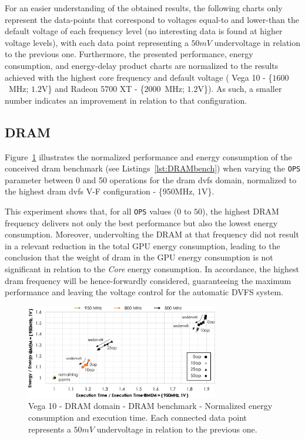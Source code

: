 For an easier understanding of the obtained results, the following charts only represent the data-points that correspond to voltages equal-to and lower-than the default voltage of each frequency level (no interesting data is found at higher voltage levels), with each data point representing a $50mV$ undervoltage in relation to the previous one.
Furthermore, the presented performance, energy consumption, and energy-delay product charts are normalized to the results achieved with the highest core frequency and default voltage ( Vega 10 - \{$1600$~MHz; $1.2$V\} and Radeon 5700 XT - \{$2000$~MHz; $1.2$V\}). As such, a smaller number indicates an improvement in relation to that configuration. 

\subsection{DRAM}

Figure~\ref{fig:DRAM_behaviour} illustrates the normalized performance and energy consumption of the conceived \acrshort{dram} benchmark (see Listings~\ref{lst:DRAMbench}) when varying the \texttt{OPS} parameter between 0 and 50 operations for the \acrshort{dram} \acrshort{dvfs} domain, normalized to the highest \acrshort{dram} \acrshort{dvfs} V-F configuration - \{950MHz, 1V\}.

This experiment shows that, for all \texttt{OPS} values ($0$ to $50$), the highest DRAM frequency delivers not only the best performance but also the lowest energy consumption. Moreover, undervolting the DRAM at that frequency did not result in a relevant reduction in the total GPU energy consumption, leading to the conclusion that the weight of \acrshort{dram} in the GPU energy consumption is not significant in relation to the \textit{Core} energy consumption. In accordance, the highest \acrshort{dram} frequency will be hence-forwardly considered, guaranteeing the maximum performance and leaving the voltage control for the automatic DVFS system.


\begin{figure}[htb]
  \centering
  \includegraphics[width=0.75\textwidth]{Figures/GPU_characterization/DRAM_behaviour.pdf}
  \caption{Vega 10 - DRAM domain - DRAM benchmark - Normalized energy consumption and execution time. Each connected data point represents a $50mV$ undervoltage in relation to the previous one.}
  \label{fig:DRAM_behaviour}
\end{figure}

